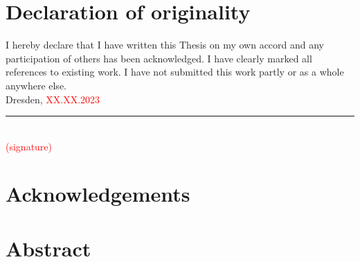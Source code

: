 \documentclass[12 pt, a4paper]{report}
\theoremstyle{definition}
\newcommand{\blankpage}{
\newpage
\thispagestyle{empty}
\addtocounter{page}{-1}
\mbox{}
\newpage
}
\begin{document}
\sloppy

\blankpage

\chapter*{Declaration of originality}
I hereby declare that I have written this Thesis on my own accord and any participation of others has been acknowledged. I have clearly marked all references to existing work. I have not submitted this work partly or as a whole anywhere else. \\

Dresden, \textcolor{red}{XX.XX.2023} \\
\rule{150 px}{0.5 px} \\
\textcolor{red}{(signature)}
\blankpage

\chapter*{Acknowledgements}
\textcolor{red}{\lipsum[1]}
\blankpage

%

\chapter*{Abstract}
\textcolor{red}{\lipsum[1]}

\tableofcontents
\pagebreak

{}
\end{document}
